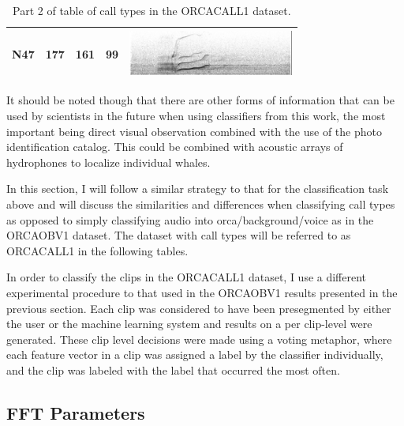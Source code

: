 \begin{table}
\begin{tabular}{|l|l|l|l|l|}
 N47     &   177      &            161  &   99                    &  \includegraphics[height=1.5cm] {figures/catalog/A12-N47-080210-D056-15012.png} \\ \hline
\end{tabular}
\caption{Part 2 of table of call types in the ORCACALL1 dataset.}
\label{table:calls-table}
\end{table}

It should be noted though that there are other forms of information
that can be used by scientists in the future when using classifiers
from this work, the most important being direct visual observation
combined with the use of the photo identification catalog.  This could
be combined with acoustic arrays of hydrophones to localize individual
whales.

In this section, I will follow a similar strategy to that for the
classification task above and will discuss the similarities and
differences when classifying call types as opposed to simply classifying
audio into orca/background/voice as in the ORCAOBV1 dataset.  The
dataset with call types will be referred to as ORCACALL1 in the following
tables.

In order to classify the clips in the ORCACALL1 dataset, I use a
different experimental procedure to that used in the ORCAOBV1 results
presented in the previous section.  Each clip was considered to have
been presegmented by either the user or the machine learning system
and results on a per clip-level were generated.  These clip level
decisions were made using a voting metaphor, where each feature vector
in a clip was assigned a label by the classifier individually, and the
clip was labeled with the label that occurred the most often.

%
%
\subsection{FFT Parameters}

